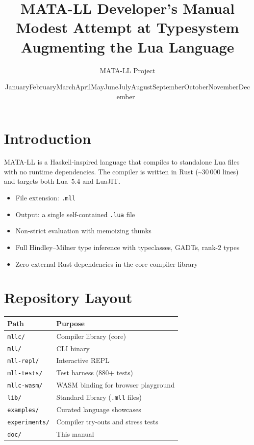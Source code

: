 \documentclass[11pt,a4paper]{article}
\title{\textbf{MATA-LL Developer's Manual}\\[6pt]
  \large Modest Attempt at Typesystem Augmenting the Lua Language}
\author{MATA-LL Project}
\date{\ifcase\month\or January\or February\or March\or April\or May\or June\or July\or August\or September\or October\or November\or December\fi\ \the\year}
\begin{document}
\maketitle
\tableofcontents
\clearpage

\section{Introduction}

MATA-LL is a Haskell-inspired language that compiles to standalone Lua files with
no runtime dependencies.  The compiler is written in Rust (\textasciitilde30\,000
lines) and targets both Lua~5.4 and LuaJIT.

\begin{itemize}[nosep]
  \item File extension: \texttt{.mll}
  \item Output: a single self-contained \texttt{.lua} file
  \item Non-strict evaluation with memoizing thunks
  \item Full Hindley--Milner type inference with typeclasses, GADTs, rank-2 types
  \item Zero external Rust dependencies in the core compiler library
\end{itemize}

\section{Repository Layout}

\begin{tabular}{@{}ll@{}}
\toprule
\textbf{Path} & \textbf{Purpose} \\
\midrule
\texttt{mllc/}       & Compiler library (core) \\
\texttt{mll/}        & CLI binary \\
\texttt{mll-repl/}   & Interactive REPL \\
\texttt{mll-tests/}  & Test harness (880+ tests) \\
\texttt{mllc-wasm/}  & WASM binding for browser playground \\
\texttt{lib/}        & Standard library (\texttt{.mll} files) \\
\texttt{examples/}   & Curated language showcases \\
\texttt{experiments/} & Compiler try-outs and stress tests \\
\texttt{doc/}        & This manual \\
\bottomrule
\end{tabular}
\end{document}
